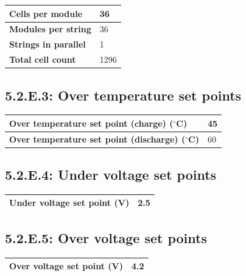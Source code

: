 \documentclass[10pt]{article}
\begin{document}
\begin{table}[!htbp]
\begin{tabular}{|l|l|}
\hline
\textbf{Cells per module}    & 36   \\ \hline
\textbf{Modules per string}  & 36   \\ \hline
\textbf{Strings in parallel} & 1    \\ \hline
\textbf{Total cell count}    & 1296 \\ \hline
\end{tabular}
\end{table}

\subsection{5.2.E.3: Over temperature set points}

\begin{table}[!htbp]
\begin{tabular}{|l|l|}
\hline
\textbf{Over temperature set point (charge) ($^{\circ}$C)}    & 45 \\ \hline
\textbf{Over temperature set point (discharge) ($^{\circ}$C)} & 60 \\ \hline
\end{tabular}
\end{table}

\subsection{5.2.E.4: Under voltage set points}

\begin{table}[!htbp]
\begin{tabular}{|l|l|}
\hline
\textbf{Under voltage set point (V)}    & 2.5 \\ \hline
\end{tabular}
\end{table}

\subsection{5.2.E.5: Over voltage set points}

\begin{table}[!htbp]
\begin{tabular}{|l|l|}
\hline
\textbf{Over voltage set point (V)}    & 4.2 \\ \hline
\end{tabular}
\end{table}
\end{document}
